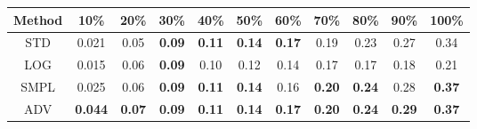 \documentclass{standalone}
\begin{document}
\begin{tabular}{c|cccccccccc}
      \toprule
      Method & 10\% & 20\% & 30\% & 40\% & 50\% & 60\% & 70\% & 80\% & 90\% & 100\% \\
      \midrule
STD & 0.021 & 0.05 & \textbf{0.09} & \textbf{0.11} & \textbf{0.14} & \textbf{0.17} & 0.19 & 0.23 & 0.27 & 0.34\\
LOG & 0.015 & 0.06 & \textbf{0.09} & 0.10 & 0.12 & 0.14 & 0.17 & 0.17 & 0.18 & 0.21\\
SMPL & 0.025 & 0.06 & \textbf{0.09} & \textbf{0.11} & \textbf{0.14} & 0.16 & \textbf{0.20} & \textbf{0.24} & 0.28 & \textbf{0.37}\\
ADV & \textbf{0.044} & \textbf{0.07} & \textbf{0.09} & \textbf{0.11} & \textbf{0.14} & \textbf{0.17} & \textbf{0.20} & \textbf{0.24} & \textbf{0.29} & \textbf{0.37}\\
  \bottomrule
\end{tabular}
\end{document}
